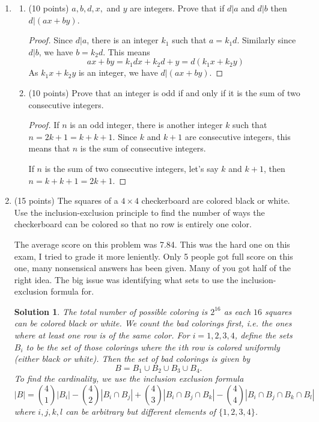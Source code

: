 \documentclass[12pt]{article}
\newtheorem*{solution}{Solution}
\begin{document}
\begin{enumerate}
\item

\begin{enumerate}
\item (10 points) $a,b,d,x,$ and $y$ are integers. Prove that if $d|a$ and $d|b$ then $d|(ax+by)$. 

\begin{proof}
Since $d|a$, there is an integer $k_1$ such that $a=k_1 d$. Similarly since $d|b$, we have $b=k_2d$. This means
\[
ax+by=k_1dx+k_2d+y=d(k_1x+k_2y)
\]
As $k_1x+k_2y$ is an integer, we have $d|(ax+by)$.
\end{proof}

\item (10 points) Prove that an integer is odd if and only if it is the sum of two consecutive integers.

\begin{proof}
If $n$ is an odd integer, there is another integer $k$ such that $n=2k+1=k+k+1$. Since $k$ and $k+1$ are consecutive integers, this means that $n$ is the sum of consecutive integers.

If $n$ is the sum of two consecutive integers, let's say $k$ and $k+1$, then $n=k+k+1=2k+1$.
\end{proof}
\end{enumerate}


\newpage
\item (15 points) The squares of a $4\times 4$ checkerboard are colored black or white. Use the inclusion-exclusion principle to find the number of ways the checkerboard can be colored so that no row is entirely one color.

The average score on this problem was 7.84. This was the hard one on this exam, I tried to grade it more leniently. Only 5 people got full score on this one, many nonsensical answers has been given. Many of you got half of the right idea. The big issue was identifying what sets to use the inclusion-exclusion formula for.

\begin{solution}
The total number of possible coloring is $2^{16}$ as each $16$ squares can be colored black or white. We count the bad colorings first, i.e. the ones where at least one row is of the same color. For $i=1,2,3,4$, define the sets $B_i$ to be the set of those colorings where the $i$th row is colored uniformly (either black or white). Then the set of bad colorings is given by
\[
B=B_1\cup B_2\cup B_3\cup B_4.
\]
To find the cardinality, we use the inclusion exclusion formula
\[
|B|=\binom{4}{1}|B_i|-\binom{4}{2}|B_i\cap B_j|+\binom{4}{3}|B_i\cap B_j\cap B_k|-\binom{4}{4}|B_i\cap B_j\cap B_k\cap{B_l}|
\]
where $i,j,k,l$ can be arbitrary but different elements of $\{1,2,3,4\}$.


\end{solution}
\end{enumerate}
\end{document}
